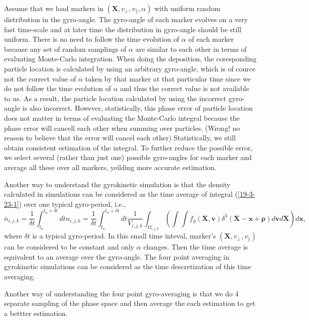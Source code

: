 \documentclass{llncs}
\newcommand{\tmmathbf}[1]{\ensuremath{\boldsymbol{#1}}}
\begin{document}
Assume that we load markers in $(\mathbf{X}, v_{\perp}, v_{\parallel},
\alpha)$ with uniform random distribution in the gyro-angle. The gyro-angle of
each marker evolves on a very fast time-scale and at later time the
distribution in gyro-angle should be still uniform. There is no need to follow
the time evolution of $\alpha$ of each marker because any set of random
samplings of $\alpha$ are similar to each other in terms of evaluating
Monte-Carlo integration. When doing the deposition, the coresponding particle
location is calculated by using an arbitrary gyro-angle, which is of cource
not the correct value of $\alpha$ taken by that marker at that particular time
since we do not follow the time evolution of $\alpha$ and thus the correct
value is not available to us. As a result, the particle location calculated by
using the incorrect gyro-angle is also incorrect. However, statistically, this
phase error of particle location does not matter in terms of evaluating the
Monte-Carlo integral because the phase error will cancell each other when
summing over particles. (Wrong! no reason to believe that the error will
cancel each other) Statistically, we still obtain consistent estimation of the
integral. To further reduce the possible error, we select several (rather than
just one) possible gyro-angles for each marker and average all these over all
markers, yeilding more accurate estimation.

Another way to understand the gyrokinetic simulation is that the density
calculated in simulations can be considered as the time average of integral
(\ref{19-3-23-1}) over one typical gyro-period, i.e.,
\begin{equation}
  \overline{n}_{i, j, k} = \frac{1}{\delta t} \int_{t_n}^{t_n + \delta t} d t
  n_{i, j, k} = \frac{1}{\delta t} \int_{t_n}^{t_n + \delta t} d t
  \frac{1}{V_{i, j, k}} \int_{\Omega_{i, j, k}} \left( \int \int f_g
  (\mathbf{X}, \mathbf{v}) \delta^3 (\mathbf{X}-\mathbf{x}+\tmmathbf{\rho})
  d\mathbf{v}d\mathbf{X} \right) d\mathbf{x},
\end{equation}
where $\delta t$ is a typical gyro-period. In this small time inteval,
marker's $(\mathbf{X}, v_{\perp}, v_{\parallel})$ can be considered to be
constant and only $\alpha$ changes. Then the time average is equivalent to an
average over the gyro-angle. The four point averaging in gyrokinetic
simulations can be considered as the time descretization of this time
averaging.

Another way of understanding the four point gyro-averaging is that we do 4
separate sampling of the phase space and then average the each estimation to
get a bettter estimation.
\end{document}
